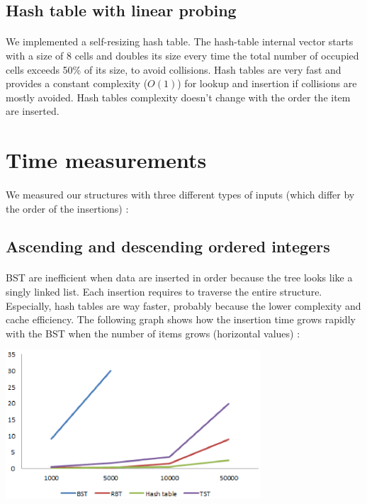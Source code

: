 \documentclass[a4paper]{article}
\begin{document}
\subsection{Hash table with linear probing}

    \paragraph{} We implemented a self-resizing hash table. The hash-table
internal vector starts with a size of 8 cells and doubles its size every time
the total number of occupied cells exceeds 50\% of its size, to avoid
collisions.
Hash tables are very fast and provides a constant complexity ($O(1)$) for lookup 
and insertion if collisions are mostly avoided.
\newline
Hash tables complexity doesn't change with the order the item are inserted.

\section{Time measurements}

    \paragraph{} We measured our structures with three different types of
inputs (which differ by the order of the insertions) :

\subsection{Ascending and descending ordered integers}

    \paragraph{} BST are inefficient when data are inserted in order because the
tree looks like a singly linked list. Each insertion requires to traverse the 
entire structure. Especially, hash tables are way faster, probably because the lower complexity
and cache efficiency.
The following graph shows how the insertion time grows rapidly with the BST when
the number of items grows (horizontal values) :

    \begin{center}
        \includegraphics[width=270pt]{insertions_enordre.eps}
    \end{center}
\end{document}
